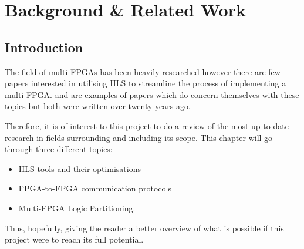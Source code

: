 \chapter{Background \& Related Work}

\section{Introduction}
The field of multi-FPGAs has been heavily researched however there are few papers interested in utilising HLS to streamline the process of implementing a multi-FPGA. \cite{564741} and \cite{707888} are examples of papers which do concern themselves with these topics but both were written over twenty years ago.

Therefore, it is of interest to this project to do a review of the most up to date research in fields surrounding and including its scope. This chapter will go through three different topics:

\begin{itemize}
    \item HLS tools and their optimisations
    \item FPGA-to-FPGA communication protocols
    \item Multi-FPGA Logic Partitioning.
\end{itemize}

Thus, hopefully, giving the reader a better overview of what is possible if this project were to reach its full potential.

